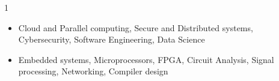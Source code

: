 \documentclass[11pt,a4paper,ragged2e]{altacv}
\begin{document}
\begin{paracol}{1}

\medskip

\begin{itemize} 
\item Cloud and Parallel computing, Secure and Distributed systems, Cybersecurity, Software Engineering, Data Science
\item Embedded systems, Microprocessors, FPGA, Circuit Analysis, Signal processing, Networking,  Compiler design
\end{itemize}





\end{paracol}
\end{document}
